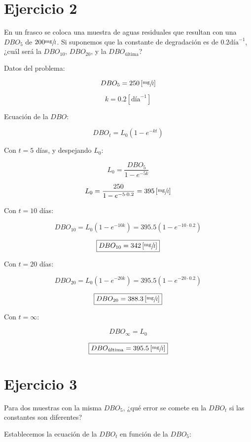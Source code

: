 \documentclass[11pt]{article}
\begin{document}
\section{Ejercicio 2}

En un frasco se coloca una muestra de aguas residuales que resultan con una \( DBO_5 \) de \( 200 \sfrac{\text{mg}}{l} \). Si suponemos que la constante de degradación es de \( 0.2 \text{día}^{-1} \), ¿cuál será la \( DBO_{10} \), \( DBO_{20} \), y la \( DBO_{\text{última}} \)?

\bigskip \bigskip

Datos del problema:

\[ DBO_5 = 250 \left[ \sfrac{\text{mg}}{l} \right] \]

\[ k = 0.2 \left[ \text{día}^{-1} \right] \]

Ecuación de la \( DBO \):

\[ DBO_t = L_0 \left( 1 - e^{-kt} \right) \]

Con \( t = 5 \) días, y despejando \( L_0 \):

\[ L_0 = \frac{DBO_5}{ 1 - e^{-5k} } \]

\[ L_0 = \frac{250}{ 1 - e^{ -5 \cdot 0.2 } } = 395 \left[ \sfrac{\text{mg}}{l} \right] \]

Con \( t = 10 \) días:

\[ DBO_{10} = L_0 \left( 1 - e^{-10k} \right) = 395.5 \left( 1 - e^{ -10 \cdot 0.2 } \right) \]

\[ \boxed{ DBO_{10} = 342 \left[ \sfrac{\text{mg}}{l} \right] } \]

Con \( t = 20 \) días:

\[ DBO_{20} = L_0 \left( 1 - e^{-20k} \right) = 395.5 \left( 1 - e^{ -20 \cdot 0.2 } \right) \]

\[ \boxed{ DBO_{20} = 388.3 \left[ \sfrac{\text{mg}}{l} \right] } \]

Con \( t = \infty \):

\[ DBO_{\infty} = L_0 \]

\[ \boxed{ DBO_{\text{última}} = 395.5 \left[ \sfrac{\text{mg}}{l} \right] } \]

\section{Ejercicio 3}

Para dos muestras con la misma \( DBO_5 \), ¿qué error se comete en la \( DBO_t \) si las constantes son diferentes?

Establecemos la ecuación de la \( DBO_t \) en función de la \( DBO_5 \):
\end{document}
